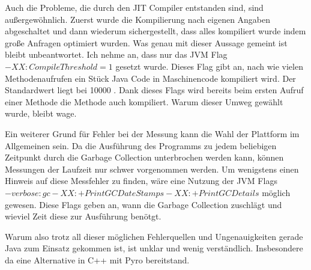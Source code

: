 Auch die Probleme, die durch den JIT Compiler entstanden sind, sind außergewöhnlich. Zuerst wurde die Kompilierung nach eigenen Angaben abgeschaltet und dann wiederum sichergestellt, dass alles kompiliert wurde indem große Anfragen optimiert wurden. Was genau mit dieser Aussage gemeint ist bleibt unbeantwortet.  Ich nehme an, dass nur das JVM Flag $-XX:CompileThreshold=1$ gesetzt wurde. Dieses Flag gibt an, nach wie vielen Methodenaufrufen ein Stück Java Code in Maschinencode kompiliert wird. Der Standardwert liegt bei 10000 \cite{oracle2015VMOptions}. Dank dieses Flags wird bereits beim ersten Aufruf einer Methode die Methode auch kompiliert. Warum dieser Umweg gewählt wurde, bleibt wage.

Ein weiterer Grund für Fehler bei der Messung kann die Wahl der Plattform im Allgemeinen sein. Da die Ausführung des Programms zu jedem beliebigen Zeitpunkt durch die Garbage Collection unterbrochen werden kann, können Messungen der Laufzeit nur schwer vorgenommen werden. Um wenigstens einen Hinweis auf diese Messfehler zu finden, wäre eine Nutzung der JVM Flags $ -verbose:gc -XX:+PrintGCDateStamps -XX:+PrintGCDetails$ möglich gewesen. Diese Flags geben an, wann die Garbage Collection zuschlägt und wieviel Zeit diese zur Ausführung benötgt. \cite{andreasson2015JVM}  


Warum also trotz all dieser möglichen Fehlerquellen und Ungenauigkeiten gerade Java zum Einsatz gekommen ist, ist unklar und wenig verständlich. Insbesondere da eine Alternative in C++ mit Pyro bereitstand.


